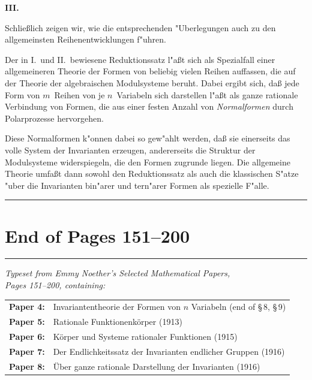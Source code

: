 \documentclass[11pt,a4paper]{article}
\begin{document}
\medskip
\noindent
\textbf{III.}

Schlie\ss{}lich zeigen wir, wie die entsprechenden "{U}berlegungen auch zu
den allgemeinsten Reihenentwicklungen f"{u}hren.

Der in I.\ und II.\ bewiesene Reduktionssatz l"{a}\ss{}t sich als Spezialfall
einer allgemeineren Theorie der Formen von beliebig vielen Reihen
auffassen, die auf der Theorie der algebraischen Modulsysteme beruht.
Dabei ergibt sich, da\ss{} jede Form von $m$~Reihen von je $n$~Variabeln
sich darstellen l"{a}\ss{}t als ganze rationale Verbindung von Formen, die aus
einer festen Anzahl von \emph{Normalformen} durch Polarprozesse hervorgehen.

Diese Normalformen k"{o}nnen dabei so gew"{a}hlt werden, da\ss{} sie einerseits
das volle System der Invarianten erzeugen, andererseits die Struktur der
Modulsysteme widerspiegeln, die den Formen zugrunde liegen. Die
allgemeine Theorie umfa\ss{}t dann sowohl den Reduktionssatz als auch die
klassischen S"{a}tze "{u}ber die Invarianten bin"{a}rer und tern"{a}rer Formen als
spezielle F"{a}lle.

\bigskip
\hrule
\bigskip

\section*{End of Pages 151--200}

\bigskip
\noindent
\rule{\textwidth}{0.4pt}

\vfill
\begin{center}
\textit{Typeset from Emmy Noether's \emph{Selected Mathematical Papers},}\\
\textit{Pages 151--200, containing:}\\[4pt]
\begin{tabular}{rl}
\textbf{Paper 4:} & Invariantentheorie der Formen von $n$ Variabeln (end of \S\,8, \S\,9)\\
\textbf{Paper 5:} & Rationale Funktionenk\"{o}rper (1913)\\
\textbf{Paper 6:} & K\"{o}rper und Systeme rationaler Funktionen (1915)\\
\textbf{Paper 7:} & Der Endlichkeitssatz der Invarianten endlicher Gruppen (1916)\\
\textbf{Paper 8:} & \"{U}ber ganze rationale Darstellung der Invarianten (1916)
\end{tabular}
\end{center}

\vfill
\end{document}
